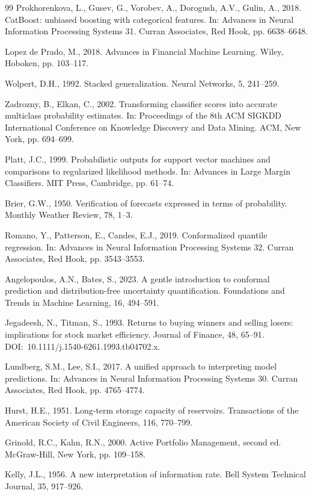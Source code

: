 \documentclass[12pt,a4paper]{article}
\begin{document}
\begin{singlespace}
\begin{thebibliography}{99}
Prokhorenkova, L., Gusev, G., Vorobev, A., Dorogush, A.V., Gulin, A., 2018.
CatBoost: unbiased boosting with categorical features. In: Advances in Neural
Information Processing Systems 31. Curran Associates, Red Hook, pp. 6638--6648.

Lopez de Prado, M., 2018. Advances in Financial Machine Learning. Wiley, Hoboken,
pp. 103--117.

Wolpert, D.H., 1992. Stacked generalization. Neural Networks, 5, 241--259.

Zadrozny, B., Elkan, C., 2002. Transforming classifier scores into accurate
multiclass probability estimates. In: Proceedings of the 8th ACM SIGKDD
International Conference on Knowledge Discovery and Data Mining. ACM, New York,
pp. 694--699.

Platt, J.C., 1999. Probabilistic outputs for support vector machines and
comparisons to regularized likelihood methods. In: Advances in Large Margin
Classifiers. MIT Press, Cambridge, pp. 61--74.

Brier, G.W., 1950. Verification of forecasts expressed in terms of probability.
Monthly Weather Review, 78, 1--3.

Romano, Y., Patterson, E., Candes, E.J., 2019. Conformalized quantile regression.
In: Advances in Neural Information Processing Systems 32. Curran Associates, Red
Hook, pp. 3543--3553.

Angelopoulos, A.N., Bates, S., 2023. A gentle introduction to conformal prediction
and distribution-free uncertainty quantification. Foundations and Trends in Machine
Learning, 16, 494--591.

Jegadeesh, N., Titman, S., 1993. Returns to buying winners and selling losers:
implications for stock market efficiency. Journal of Finance, 48, 65--91.
\mbox{DOI: 10.1111/j.1540-6261.1993.tb04702.x.}

Lundberg, S.M., Lee, S.I., 2017. A unified approach to interpreting model
predictions. In: Advances in Neural Information Processing Systems 30. Curran
Associates, Red Hook, pp. 4765--4774.

Hurst, H.E., 1951. Long-term storage capacity of reservoirs. Transactions of the
American Society of Civil Engineers, 116, 770--799.

Grinold, R.C., Kahn, R.N., 2000. Active Portfolio Management, second ed.
McGraw-Hill, New York, pp. 109--158.

Kelly, J.L., 1956. A new interpretation of information rate. Bell System Technical
Journal, 35, 917--926.

\end{thebibliography}
\end{singlespace}
\end{document}
